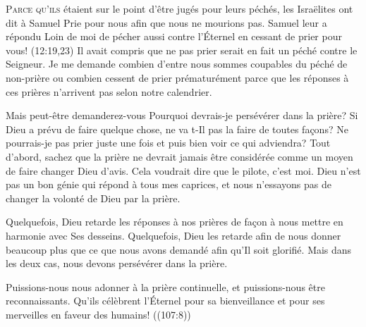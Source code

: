 \dvrule







\lettrine{P}{arce qu'ils} étaient sur le point d'être jugés pour leurs péchés,
 les Israëlites ont dit à Samuel\frcolon{} 
 \Og Prie pour nous afin que nous ne mourions pas. \Fg{} 
 Samuel leur a répondu\frcolon{} 
 \Og Loin de moi de pécher aussi contre l'Éternel en cessant de prier
 pour vous! \Fg{}
 (12:19,23)
 Il avait compris que ne pas prier serait en fait un péché contre le Seigneur.
 Je me demande combien d'entre nous sommes coupables du péché de
 \Og non-prière \Fg{} ou combien cessent de prier prématurément
 parce que les réponses à ces prières n'arrivent pas
 selon notre calendrier.


Mais peut-être demanderez-vous\frcolon{} 
 \Og Pourquoi devrais-je persévérer dans la prière?
 Si Dieu a prévu de faire quelque chose, ne va t-Il pas la faire
 de toutes fa\c{c}ons? Ne pourrais-je pas prier juste une fois et puis bien voir
 ce qui adviendra? \Fg{}
 Tout d'abord, sachez que la prière ne devrait jamais être considérée
 comme un moyen de faire changer Dieu d'avis.
 Cela voudrait dire que le pilote, c'est moi.
 Dieu n'est pas un bon génie qui répond à tous mes caprices,
 et nous n'essayons pas de changer la volonté de Dieu par la prière.

Quelquefois, Dieu retarde les réponses à nos prières de fa\c{c}on à nous mettre
 en harmonie avec Ses desseins. Quelquefois, Dieu les retarde afin de nous
 donner beaucoup plus que ce que nous avons demandé afin qu'Il soit glorifié.
 Mais dans les deux cas, nous devons persévérer dans la prière.

Puissions-nous nous adonner à la prière continuelle, et puissions-nous
 être reconnaissants.
 \Og Qu'ils célèbrent l'Éternel pour sa bienveillance et pour ses merveilles
 en faveur des humains! \Fg{} ((107:8))

